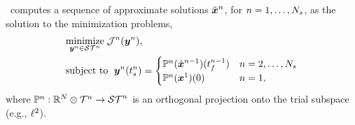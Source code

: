 \methodAcronym\ computes a sequence of approximate solutions $\tilde{\boldsymbol x}^{n}$, for $n=1,\ldots,N_s$, as the solution to the minimization problems,
\begin{equation}\label{eq:tclsrm}
\begin{split}
      &\underset{\boldsymbol y^{n} \in \mathcal{ ST }^n}{\text{minimize}} \; \mathcal{J}^n(\boldsymbol y^{n}), \\
      &\text{subject to } \;  \boldsymbol y^{n}(t_s^{n}) =
\begin{cases}\mathbb{P}^n (\tilde{\boldsymbol x}^{n-1})(t_f^{n-1}) & n = 2,\ldots,N_s \\
\mathbb{P}^n( {\boldsymbol x}^{1})(0)& n=1, \end{cases} 
\end{split}
\end{equation}
where $\mathbb{P}^n: \mathbb{R}^{N} \otimes \mathcal{T}^{n} \rightarrow \mathcal{ ST }^{n}$ is an orthogonal projection onto the 
trial subspace (e.g., $\ell^2$).
